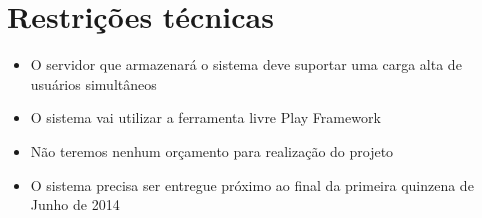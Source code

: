 \documentclass[12pt, a4paper]{article}
\begin{document}
    \section{Restrições técnicas}
    \begin{itemize}
        \item{O servidor que armazenará o sistema deve suportar uma carga alta de usuários simultâneos} 
        \item{O sistema vai utilizar a ferramenta livre Play Framework}
        \item{Não teremos nenhum orçamento para realização do projeto}
        \item{O sistema precisa ser entregue próximo ao final da primeira quinzena de Junho de 2014}
    \end{itemize}
\end{document}
